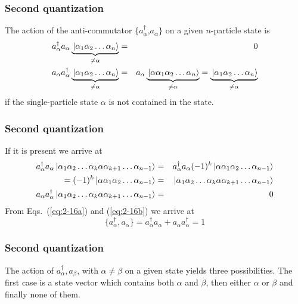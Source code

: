 \frame
{
  \frametitle{Second quantization}
\begin{small}
{\scriptsize
The action of the anti-commutator 
$\{a_\alpha^\dagger$,$a_\alpha\}$ on a given $n$-particle state is
\begin{eqnarray}
	a_\alpha^\dagger a_\alpha \underbrace{\ket{\alpha_1\alpha_2 \dots \alpha_{n}}}_{\neq \alpha} &=& 0 \nonumber \\
	a_\alpha a_\alpha^\dagger \underbrace{\ket{\alpha_1\alpha_2 \dots \alpha_{n}}}_{\neq \alpha} &=&
	a_\alpha \underbrace{\ket{\alpha \alpha_1\alpha_2 \dots \alpha_{n}}}_{\neq \alpha} = 
	\underbrace{\ket{\alpha_1\alpha_2 \dots \alpha_{n}}}_{\neq \alpha} \label{eq:2-16a}
\end{eqnarray}
if the single-particle state $\alpha$ is not contained in the state.
}
\end{small}
}
\frame
{
  \frametitle{Second quantization}
\begin{small}
{\scriptsize
 If it is present
we arrive at
\begin{eqnarray}
	a_\alpha^\dagger a_\alpha \ket{\alpha_1\alpha_2 \dots \alpha_{k}\alpha \alpha_{k+1} \dots \alpha_{n-1}} &=&
	a_\alpha^\dagger a_\alpha (-1)^k \ket{\alpha \alpha_1\alpha_2 \dots \alpha_{n-1}} \nonumber \\
	= (-1)^k \ket{\alpha \alpha_1\alpha_2 \dots \alpha_{n-1}} &=& 
	\ket{\alpha_1\alpha_2 \dots \alpha_{k}\alpha \alpha_{k+1} \dots \alpha_{n-1}} \nonumber \\
	a_\alpha a_\alpha^\dagger\ket{\alpha_1\alpha_2 \dots \alpha_{k}\alpha \alpha_{k+1} \dots \alpha_{n-1}} &=& 0 \label{eq:2-16b}
\end{eqnarray}
From Eqs.~(\ref{eq:2-16a}) and  (\ref{eq:2-16b}) we arrive at 
\begin{equation}
	\{a_\alpha^\dagger , a_\alpha \} = a_\alpha^\dagger a_\alpha + a_\alpha a_\alpha^\dagger = 1 \label{eq:2-17}
\end{equation}
}
\end{small}
}
\frame
{
  \frametitle{Second quantization}
\begin{small}
{\scriptsize
The action of ${a_\alpha^\dagger, a_\beta}$, with 
$\alpha \ne \beta$ on a given state yields three possibilities. 
The first case is a state vector which contains both $\alpha$ and $\beta$, then either 
$\alpha$ or $\beta$ and finally none of them.
}
\end{small}
}
\frame
